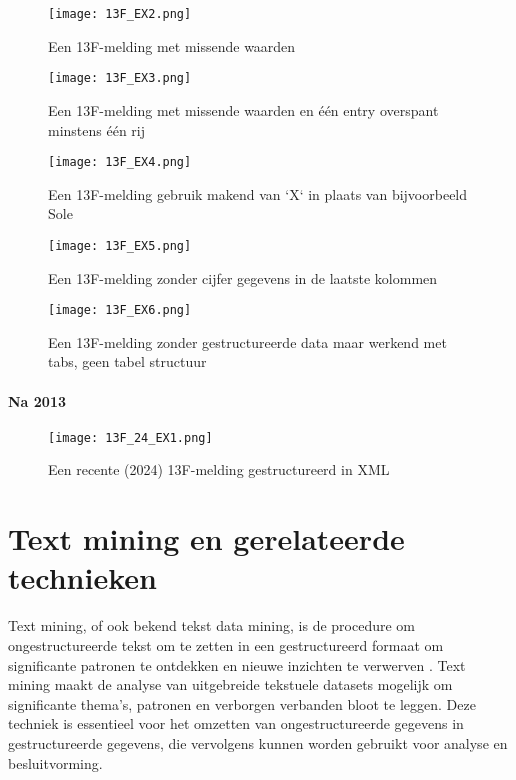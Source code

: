 \begin{figure}[hbt!]
    \texttt{[image: 13F\_EX2.png]}
    \caption[13F voorbeeld 3]{\label{fig:voorbeeld 2}Een 13F-melding met missende waarden}
\end{figure}
\begin{figure}[hbt!]
    \texttt{[image: 13F\_EX3.png]}
    \caption[13F voorbeeld 4]{\label{fig:voorbeeld 3}Een 13F-melding met missende waarden en één entry overspant minstens één rij}
\end{figure}

\begin{figure}[hbt!]
    \texttt{[image: 13F\_EX4.png]}
    \caption[13F voorbeeld 5]{\label{fig:voorbeeld 4}Een 13F-melding gebruik makend van `X` in plaats van bijvoorbeeld Sole}
\end{figure}

\begin{figure}[hbt!]
    \texttt{[image: 13F\_EX5.png]}
    \caption[13F voorbeeld 6]{\label{fig:voorbeeld 5}Een 13F-melding zonder cijfer gegevens in de laatste kolommen}
\end{figure}

\begin{figure}[hbt!]
    \texttt{[image: 13F\_EX6.png]}
    \caption[13F voorbeeld 7]{\label{fig:voorbeeld 6}Een 13F-melding zonder gestructureerde data maar werkend met tabs, geen tabel structuur}
\end{figure}
\paragraph{Na 2013}

\begin{figure}[hbt!]
    \texttt{[image: 13F\_24\_EX1.png]}
    \caption[13F voorbeeld 7]{\label{fig:voorbeeld 2024 1}Een recente (2024) 13F-melding gestructureerd in XML}
\end{figure}


\section{Text mining en gerelateerde technieken}
Text mining, of ook bekend tekst data mining, is de procedure om ongestructureerde tekst om te zetten in een gestructureerd formaat om significante patronen te ontdekken en nieuwe inzichten te verwerven \autocite{IBM2024}. Text mining maakt de analyse van uitgebreide tekstuele datasets mogelijk om significante thema's, patronen en verborgen verbanden bloot te leggen. Deze techniek is essentieel voor het omzetten van ongestructureerde gegevens in gestructureerde gegevens, die vervolgens kunnen worden gebruikt voor analyse en besluitvorming.

